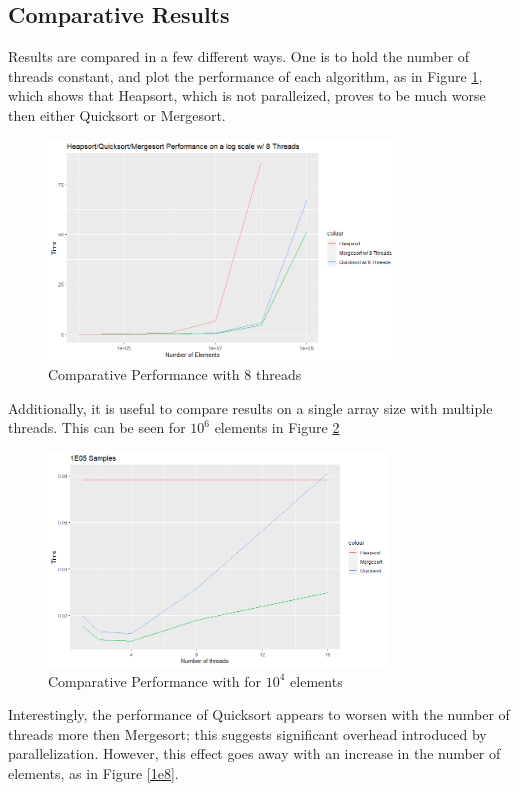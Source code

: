 \documentclass[conference]{IEEEtran}
\begin{document}
    \subsection{Comparative Results}
    Results are compared in a few different ways. 
    One is to hold the number of threads constant, and plot the performance of each algorithm, as in Figure \ref{msqshs}, which shows that Heapsort, which is not paralleized, proves to be much worse then either Quicksort or Mergesort.
    \begin{figure}
        \includegraphics[width=9.25cm]{mshsqs.png} 
        \caption{Comparative Performance with 8 threads}
        \label{msqshs}
    \end{figure}
    Additionally, it is useful to compare results on a single array size with multiple threads. 
    This can be seen for $10^6$ elements in Figure \ref{1e5}
    \begin{figure}
        \includegraphics[width=9cm]{1e5.png} 
        \caption{Comparative Performance with for $10^4$ elements}
        \label{1e5}
    \end{figure}
    Interestingly, the performance of Quicksort appears to worsen with the number of threads more then Mergesort; this suggests significant overhead introduced by parallelization. 
    However, this effect goes away with an increase in the number of elements, as in Figure \ref{1e8}. 
\end{document}
